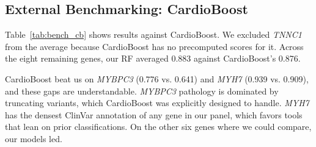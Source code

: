 \documentclass[conference]{IEEEtran}
\begin{document}
\begin{table}[h]
\centering
\caption{AUPRC Comparison: Our Models vs.\ REVEL and MetaRNN.
  $n$ denotes the number of variants matched to dbNSFP.
  Best value per gene shown in \textbf{bold}.}
\label{tab:bench_revel}
\end{table}

\subsection{External Benchmarking: CardioBoost}

Table~\ref{tab:bench_cb} shows results against CardioBoost. We excluded \textit{TNNC1} from the average because CardioBoost has no precomputed scores for it. Across the eight remaining genes, our RF averaged 0.883 against CardioBoost's 0.876.

CardioBoost beat us on \textit{MYBPC3} (0.776 vs. 0.641) and \textit{MYH7} (0.939 vs. 0.909), and these gaps are understandable. \textit{MYBPC3} pathology is dominated by truncating variants, which CardioBoost was explicitly designed to handle. \textit{MYH7} has the densest ClinVar annotation of any gene in our panel, which favors tools that lean on prior classifications. On the other six genes where we could compare, our models led.
\end{document}
